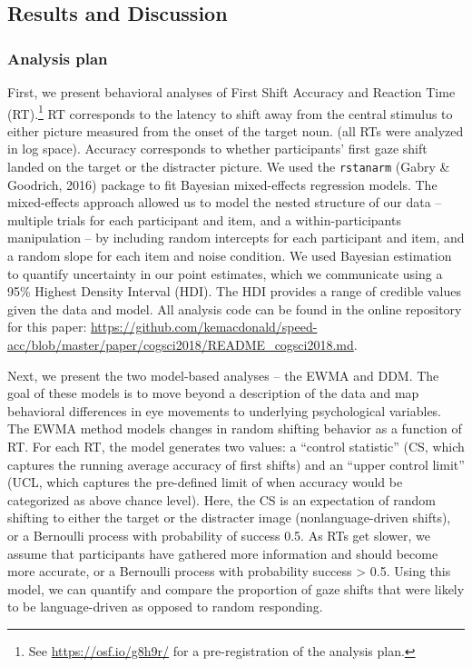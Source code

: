 \documentclass[10pt, letterpaper]{article}
\begin{document}
\subsection{Results and Discussion}\label{results-and-discussion}

\subsubsection{Analysis plan}\label{analysis-plan}

First, we present behavioral analyses of First Shift Accuracy and
Reaction Time (RT).\footnote{See \url{https://osf.io/g8h9r/} for a
  pre-registration of the analysis plan.} RT corresponds to the latency
to shift away from the central stimulus to either picture measured from
the onset of the target noun. (all RTs were analyzed in log space).
Accuracy corresponds to whether participants' first gaze shift landed on
the target or the distracter picture. We used the \texttt{rstanarm}
(Gabry \& Goodrich, 2016) package to fit Bayesian mixed-effects
regression models. The mixed-effects approach allowed us to model the
nested structure of our data -- multiple trials for each participant and
item, and a within-participants manipulation -- by including random
intercepts for each participant and item, and a random slope for each
item and noise condition. We used Bayesian estimation to quantify
uncertainty in our point estimates, which we communicate using a 95\%
Highest Density Interval (HDI). The HDI provides a range of credible
values given the data and model. All analysis code can be found in the
online repository for this paper:
\url{https://github.com/kemacdonald/speed-acc/blob/master/paper/cogsci2018/README_cogsci2018.md}.

Next, we present the two model-based analyses -- the EWMA and DDM. The
goal of these models is to move beyond a description of the data and map
behavioral differences in eye movements to underlying psychological
variables. The EWMA method models changes in random shifting behavior as
a function of RT. For each RT, the model generates two values: a
``control statistic'' (CS, which captures the running average accuracy
of first shifts) and an ``upper control limit'' (UCL, which captures the
pre-defined limit of when accuracy would be categorized as above chance
level). Here, the CS is an expectation of random shifting to either the
target or the distracter image (nonlanguage-driven shifts), or a
Bernoulli process with probability of success 0.5. As RTs get slower, we
assume that participants have gathered more information and should
become more accurate, or a Bernoulli process with probability success
\textgreater{} 0.5. Using this model, we can quantify and compare the
proportion of gaze shifts that were likely to be language-driven as
opposed to random responding.
\end{document}
